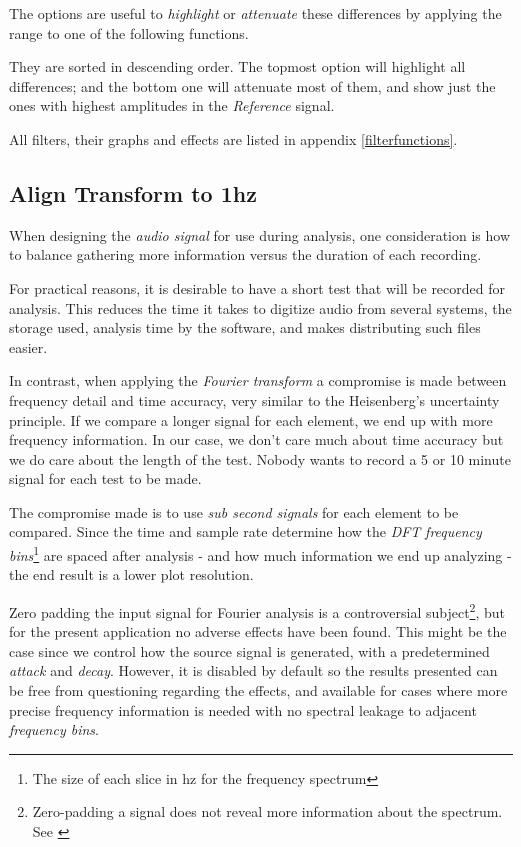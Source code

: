 \documentclass[10pt,a4paper]{report}
\begin{document}
\begin{appendices}
The options are useful to \textit{highlight} or \textit{attenuate} these differences by applying the range to one of the following functions. 

They are sorted in descending order. The topmost option will highlight all differences; and the bottom one will attenuate most of them, and show just the ones with highest amplitudes in the \textit{Reference} signal.

All filters, their graphs and effects are listed in appendix \ref{filterfunctions}.

\subsection{Align Transform to 1hz}

When designing the \textit{audio signal} for use during analysis, one consideration is how to balance gathering more information versus the duration of each recording. 

For practical reasons, it is desirable to have a short test that will be recorded for analysis. This reduces the time it takes to digitize audio from several systems, the storage used, analysis time by the software, and makes distributing such files easier.

In contrast, when applying the \textit{Fourier transform} a compromise is made between frequency detail and time accuracy, very similar to the Heisenberg's uncertainty principle. If we compare a longer signal for each element, we end up with more frequency information. In our case, we don't care much about time accuracy but we do care about the length of the test. Nobody wants to record a 5 or 10 minute signal for each test to be made.

The compromise made is to use \textit{sub second signals} for each element to be compared. Since the time and sample rate determine how the \textit{DFT} \textit{frequency bins}\footnote{The size of each slice in hz for the frequency spectrum} are spaced after analysis - and how much information we end up analyzing - the end result is a lower plot resolution.

Zero padding the input signal for Fourier analysis is a controversial subject\footnote{Zero-padding a signal does not reveal more information about the spectrum. See \cite{zeropaddinginterpolate} \cite{ZeroPaddingBad}}, but for the present application no adverse effects have been found. This might be the case since we control how the source signal is generated, with a predetermined \textit{attack} and \textit{decay}. However, it is disabled by default so the results presented can be free from questioning regarding the effects, and available for cases where more precise frequency information is needed with no spectral leakage to adjacent \textit{frequency bins}.


\end{appendices}
\end{document}
